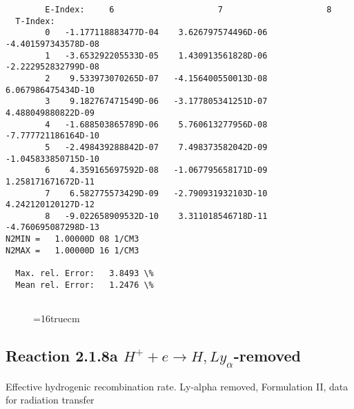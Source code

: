 \documentclass[12pt,dvipdfmx]{article}
\begin{document}
\begin{small}
\begin{verbatim}
        E-Index:     6                     7                     8
  T-Index:
        0   -1.177118883477D-04    3.626797574496D-06   -4.401597343578D-08
        1   -3.653292205533D-05    1.430913561828D-06   -2.222952832799D-08
        2    9.533973070265D-07   -4.156400550013D-08    6.067986475434D-10
        3    9.182767471549D-06   -3.177805341251D-07    4.488049880822D-09
        4   -1.688503865789D-06    5.760613277956D-08   -7.777721186164D-10
        5   -2.498439288842D-07    7.498373582042D-09   -1.045833850715D-10
        6    4.359165697592D-08   -1.067795658171D-09    1.258171671672D-11
        7    6.582775573429D-09   -2.790931932103D-10    4.242120120127D-12
        8   -9.022658909532D-10    3.311018546718D-11   -4.760695087298D-13
N2MIN =   1.00000D 08 1/CM3
N2MAX =   1.00000D 16 1/CM3

  Max. rel. Error:   3.8493 \%
  Mean rel. Error:   1.2476 \%


\end{verbatim}\end{small}
\begin{figure} \label{2.1.5e}
\epsfxsize=16truecm
\end{figure}
\newpage
\subsection{
Reaction 2.1.8a  $H^+ + e \rightarrow H, Ly_\alpha$-removed
}


   Effective hydrogenic recombination rate.
   Ly-alpha removed, Formulation II, data for radiation transfer
\end{document}

